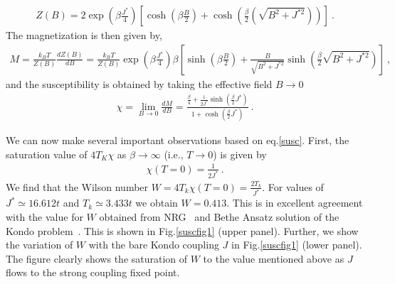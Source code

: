 \documentclass[aps,prb,preprint,groupedaddress]{revtex4-2}
\begin{document}
\begin{eqnarray}
Z(B)=2\exp(\beta\frac{J^{*}}{4})\left[\cosh(\beta\frac{B}{2})+\cosh(\frac{\beta}{2}(\sqrt{B^{2}+J^{*2}}))\right]~.
\end{eqnarray}
The magnetization is then given by,
\begin{eqnarray}
M=\frac{k_{B}T}{Z(B)}\frac{dZ(B)}{dB}=\frac{k_{B}T}{Z(B)}\exp(\beta\frac{J^{*}}{4})\beta\left[\sinh(\beta\frac{B}{2})
+\frac{B}{\sqrt{B^{2}+J^{*2}}}\sinh(\frac{\beta}{2}\sqrt{B^{2}+J^{*2}})\right]~,
\end{eqnarray}
and the susceptibility is obtained by taking the effective field $B\to 0$
\begin{eqnarray}
\chi=\lim_{B\to 0}\frac{dM}{dB}=\frac{\frac{\beta}{4}+\frac{1}{2J^{*}}\sinh(\frac{\beta}{2}J^{*})}{1+\cosh(\frac{\beta}{2}J^{*})}~.
\label{susc}
\end{eqnarray}
\par\noindent
We can now make several important observations based on eq.\ref{susc}. First, the saturation value of $4T_{K}\chi$ as $\beta\to \infty$ (i.e., $T\to 0$) is given by
\begin{eqnarray}
\chi(T=0)=\frac{1}{2J^{*}}~.
\end{eqnarray}
We find that the Wilson number $W=4T_{k}\chi(T=0)=\frac{2T_{k}}{J^{*}}$. For values of $J^{*}\simeq 16.612t$ and $T_{k}\simeq 3.433t$ we obtain $W=0.413$. This is in excellent agreement with the value for $W$ obtained from NRG~\cite{bullaNRGreview} and Bethe Ansatz solution of the Kondo problem~\cite{andreiKondoreview,tsvelickKondoreview}. This is shown in Fig.\ref{suscfig1} (upper panel). Further, we show the variation of $W$ with the bare Kondo coupling $J$ in Fig.\ref{suscfig1} (lower panel). The figure clearly shows the saturation of $W$ to the value mentioned above as $J$ flows to the strong coupling fixed point.
\end{document}
